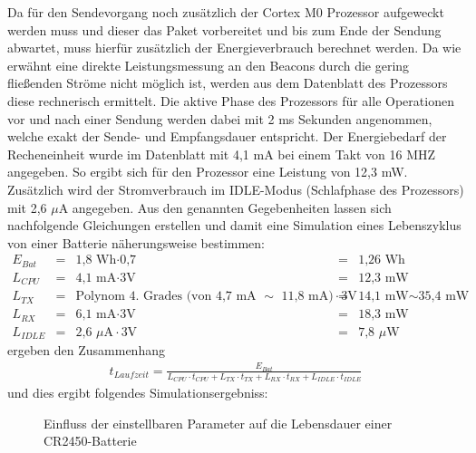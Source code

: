 Da für den Sendevorgang noch zusätzlich der Cortex M0 Prozessor aufgeweckt werden muss und dieser das Paket vorbereitet und bis zum Ende der Sendung abwartet, muss hierfür zusätzlich der Energieverbrauch berechnet werden. Da wie erwähnt eine direkte Leistungsmessung an den Beacons durch die gering fließenden Ströme nicht möglich ist, werden aus dem Datenblatt des Prozessors diese rechnerisch ermittelt. Die aktive Phase des Prozessors für alle Operationen vor und nach einer Sendung werden dabei mit 2 ms Sekunden angenommen, welche exakt der Sende- und Empfangsdauer entspricht. Der Energiebedarf der Recheneinheit wurde im Datenblatt mit 4,1 mA bei einem Takt von 16 MHZ angegeben. So ergibt sich für den Prozessor eine Leistung von 12,3 mW. Zusätzlich wird der Stromverbrauch im IDLE-Modus (Schlafphase des Prozessors) mit 2,6 $\mu$A angegeben. Aus den genannten Gegebenheiten lassen sich nachfolgende Gleichungen erstellen und damit eine Simulation eines Lebenszyklus von einer Batterie näherungsweise bestimmen:
\begin{align*}
E_{Bat} &=& \text{1,8 Wh} \cdot \text{0,7} &=& \text{1,26 Wh}\\
L_{CPU} &=& \text{4,1 mA} \cdot \text{3V} &=& \text{12,3 mW}\\
L_{TX} &=& \text{Polynom 4. Grades (von 4,7 mA }\sim\text{ 11,8 mA)} \cdot \text{3V} &=& \text{14,1 mW} \sim \text{35,4 mW}\\
L_{RX} &=& \text{6,1 mA} \cdot \text{3V} &=& \text{18,3 mW}\\
L_{IDLE} &=& \text{2,6 } \mu\text{A} \cdot \text{3V} &=& \text{7,8 } \mu\text{W}
\end{align*}
ergeben den Zusammenhang
\begin{align*}
t_{Laufzeit} = \frac{E_{Bat}}{L_{CPU}\cdot t_{CPU} + L_{TX}\cdot t_{TX} + L_{RX}\cdot t_{RX} + L_{IDLE}\cdot t_{IDLE}} 
\end{align*}
und dies ergibt folgendes Simulationsergebniss:
\pgfplotsset{
    colormap/jet,
}
\begin{figure}[H]
\centering
{}
\caption{Einfluss der einstellbaren Parameter auf die Lebensdauer einer CR2450-Batterie}
\label{fig:iBBatLe}
\end{figure}
